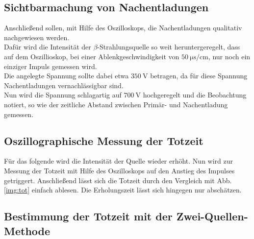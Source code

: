 \subsection{Sichtbarmachung von Nachentladungen}


\noindent
Anschließend sollen, mit Hilfe des Oszilloskops, die Nachentladungen qualitativ nachgewiesen werden.\\
Dafür wird die Intensität der $\beta$-Strahlungsquelle so weit heruntergeregelt, dass auf dem Oszillioskop, bei einer Ablenkgeschwindigkeit von $\SI{50}{\micro\second\per\centi\metre}$, 
nur noch ein einziger Impuls gemessen wird. \\
Die angelegte Spannung sollte dabei etwa $\SI{350}{\volt}$ betragen, da für diese Spannung Nachentladungen vernachlässigbar sind.\\
Nun wird die Spannung schlagartig auf $\SI{700}{\volt}$ hochgeregelt und die Beobachtung notiert, so wie der zeitliche Abstand zwischen Primär- und Nachentladung gemessen.

\subsection{Oszillographische Messung der Totzeit}


\noindent
Für das folgende wird die Intensität der Quelle wieder erhöht.
Nun wird zur Messung der Totzeit mit Hilfe des Oszilloskops auf den Anstieg des Impulses getriggert.
Anschließend lässt sich die Totzeit durch den Vergleich mit Abb. \ref{img:tot} einfach ablesen. Die Erholungszeit lässt sich hingegen nur abschätzen.

\subsection{Bestimmung der Totzeit mit der Zwei-Quellen-Methode}


